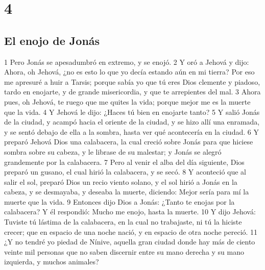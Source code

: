 \chapter{4}

\section*{El enojo de Jonás}

1 Pero Jonás se apesadumbró en extremo, y se enojó.
2 Y oró a Jehová y dijo: Ahora, oh Jehová, ¿no es esto lo que yo decía estando aún en mi tierra? Por eso me apresuré a huir a Tarsis; porque sabía yo que tú eres Dios clemente y piadoso, tardo en enojarte, y de grande misericordia, y que te arrepientes del mal.
3 Ahora pues, oh Jehová, te ruego que me quites la vida; porque mejor me es la muerte que la vida.
4 Y Jehová le dijo: ¿Haces tú bien en enojarte tanto?
5 Y salió Jonás de la ciudad, y acampó hacia el oriente de la ciudad, y se hizo allí una enramada, y se sentó debajo de ella a la sombra, hasta ver qué acontecería en la ciudad.
6 Y preparó Jehová Dios una calabacera, la cual creció sobre Jonás para que hiciese sombra sobre su cabeza, y le librase de su malestar; y Jonás se alegró grandemente por la calabacera.
7 Pero al venir el alba del día siguiente, Dios preparó un gusano, el cual hirió la calabacera, y se secó.
8 Y aconteció que al salir el sol, preparó Dios un recio viento solano, y el sol hirió a Jonás en la cabeza, y se desmayaba, y deseaba la muerte, diciendo: Mejor sería para mí la muerte que la vida.
9 Entonces dijo Dios a Jonás: ¿Tanto te enojas por la calabacera? Y él respondió: Mucho me enojo, hasta la muerte.
10 Y dijo Jehová: Tuviste tú lástima de la calabacera, en la cual no trabajaste, ni tú la hiciste crecer; que en espacio de una noche nació, y en espacio de otra noche pereció.
11 ¿Y no tendré yo piedad de Nínive, aquella gran ciudad donde hay más de ciento veinte mil personas que no saben discernir entre su mano derecha y su mano izquierda, y muchos animales?

